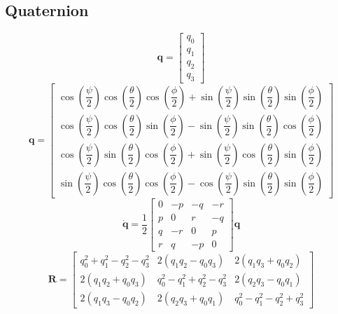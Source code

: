 \subsection{Quaternion}
\[
    \bm{q} = \begin{bmatrix}
        q_0 \\
        q_1 \\
        q_2 \\
        q_3
    \end{bmatrix}
\]
\[
    \bm{q} = \begin{bmatrix}
        \cos(\dfrac{\psi}{2})\cos(\dfrac{\theta}{2})\cos(\dfrac{\phi}{2}) + \sin(\dfrac{\psi}{2})\sin(\dfrac{\theta}{2})\sin(\dfrac{\phi}{2}) \\[2em]
        \cos(\dfrac{\psi}{2})\cos(\dfrac{\theta}{2})\sin(\dfrac{\phi}{2}) - \sin(\dfrac{\psi}{2})\sin(\dfrac{\theta}{2})\cos(\dfrac{\phi}{2}) \\[2em]
        \cos(\dfrac{\psi}{2})\sin(\dfrac{\theta}{2})\cos(\dfrac{\phi}{2}) + \sin(\dfrac{\psi}{2})\cos(\dfrac{\theta}{2})\sin(\dfrac{\phi}{2}) \\[2em]
        \sin(\dfrac{\psi}{2})\cos(\dfrac{\theta}{2})\cos(\dfrac{\phi}{2}) - \cos(\dfrac{\psi}{2})\sin(\dfrac{\theta}{2})\sin(\dfrac{\phi}{2})
    \end{bmatrix}
\]
\[
    \dot{\bm{q}} = \dfrac{1}{2}\begin{bmatrix}
        0 & -p & -q & -r \\
        p & 0 & r & -q \\
        q & -r & 0 & p \\
        r & q & -p & 0
    \end{bmatrix} \bm{q}
\]
\[
    \bm{R} = \begin{bmatrix}
        q_0^2 + q_1^2 - q_2^2 - q_3^2 & 2(q_1q_2 - q_0q_3) & 2(q_1q_3 + q_0q_2) \\
        2(q_1q_2 + q_0q_3) & q_0^2 - q_1^2 + q_2^2 - q_3^2 & 2(q_2q_3 - q_0q_1) \\
        2(q_1q_3 - q_0q_2) & 2(q_2q_3 + q_0q_1) & q_0^2 - q_1^2 - q_2^2 + q_3^2
    \end{bmatrix}
    \]


